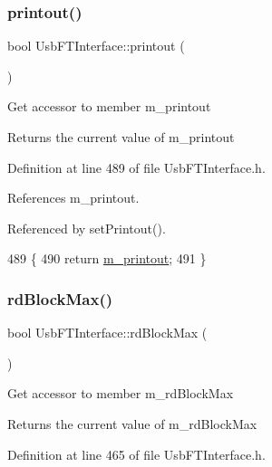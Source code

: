 \subsubsection{\texorpdfstring{printout()}{printout()}}
{\footnotesize\ttfamily bool Usb\+F\+T\+Interface\+::printout (\begin{DoxyParamCaption}{ }\end{DoxyParamCaption})\hspace{0.3cm}{\ttfamily [inline]}}

Get accessor to member m\+\_\+printout \begin{DoxyReturn}{Returns}
the current value of m\+\_\+printout 
\end{DoxyReturn}


Definition at line 489 of file Usb\+F\+T\+Interface.\+h.



References m\+\_\+printout.



Referenced by set\+Printout().


\begin{DoxyCode}
489                    \{
490     \textcolor{keywordflow}{return} \hyperlink{classUsbFTInterface_aa4d5f5ffb4d3b26f1effdf84087aea91}{m\_printout};
491   \}
\end{DoxyCode}
\mbox{\label{classUsbFTInterface_a9f213ab1804e61af476bbdd3ade2d053}} 
\subsubsection{\texorpdfstring{rd\+Block\+Max()}{rdBlockMax()}}
{\footnotesize\ttfamily bool Usb\+F\+T\+Interface\+::rd\+Block\+Max (\begin{DoxyParamCaption}{ }\end{DoxyParamCaption})\hspace{0.3cm}{\ttfamily [inline]}}

Get accessor to member m\+\_\+rd\+Block\+Max \begin{DoxyReturn}{Returns}
the current value of m\+\_\+rd\+Block\+Max 
\end{DoxyReturn}


Definition at line 465 of file Usb\+F\+T\+Interface.\+h.



